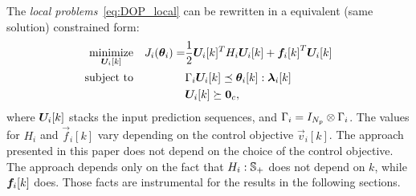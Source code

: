 \documentclass{ifacconf}  %
\begin{document}
The \emph{local problems}~\eqref{eq:DOP_local} can be rewritten in a equivalent (same solution) constrained \qp{} form:
  \begin{subequations}\label{eq:quadratic_case}
    \begin{align}
      \label{eq:4}
      \underset{\Uik}{\mathrm{minimize}}&&\small J_{i}(\vec{\theta}_{i})=&\frac{1}{2} \Uik^T H_i\Uik +{\fik}^T\Uik\\
      \mathrm{subject~ to}&&&\bar{\Gamma}_{i}\Uik\preceq\vec{\theta}_{i}[k]:\vec{\lambda}_{i}[k]\label{eq:constraints}\\
                                        &&&\Uik\succeq\0_{c},
    \end{align}
  \end{subequations}
where ${\Uik}$ stacks the input prediction sequences, and
${\relax{\Gamma}_{i}=I_{N_{p}}\mathbin{\otimes}\Gamma_{i}}$.
The values for $H_{i}$ and $\vec{f}_{i}[k]$ vary depending on the control objective $\vec{v}_{i}[k]$. The approach presented in this paper does not depend on the choice of the control objective.
The approach depends only on the fact that ${H_{i}:\mathbb{S}_{+}}$ does not depend on $k$, while $\fik$ does. Those facts are instrumental for the results in the following sections.

\end{document}
